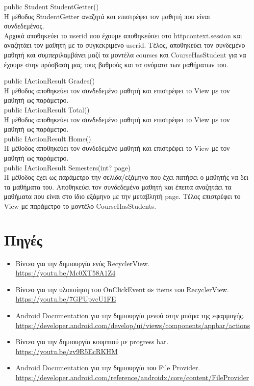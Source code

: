 \documentclass[12pt]{article}
\begin{document}
	public  Student StudentGetter()\\
	
	Η μέθοδος StudentGetter αναζητά και επιστρέφει τον μαθητή που είναι συνδεδεμένος.\\
	Αρχικά αποθηκεύει το userid που έχουμε αποθηκεύσει στο httpcontext.session και αναζητάει τον μαθητή με το συγκεκριμένο userid. Τέλος, αποθηκεύει τον συνδεμένο μαθητή και συμπεριλαμβάνει μαζί τα μοντέλα courses και CourseHasStudent για να έχουμε στην πρόσβαση μας τους βαθμούς και τα ονόματα των μαθήματων του.
	
	public IActionResult Grades()\\
	Η μέθοδος αποθηκεύει τον συνδεδεμένο μαθητή και επιστρέφει το View με τον μαθητή ως παράμετρο. \\
	public IActionResult Total()\\
	Η μέθοδος αποθηκεύει τον συνδεδεμένο μαθητή και επιστρέφει το View με τον μαθητή ως παράμετρο. \\
	
	public IActionResult Home()\\
	Η μέθοδος αποθηκεύει τον συνδεδεμένο μαθητή και επιστρέφει το View με τον μαθητή ως παράμετρο. \\
	
	public IActionResult Semesters(int? page)\\
	Η μέθοδος έχει ως παράμετρο την σελίδα/εξάμηνο που έχει πατήσει ο μαθητής να δει τα μαθήματα του. Αποθηκεύει τον συνδεδεμένο μαθητή και έπειτα αναζητάει τα μαθήματα που είναι στο ίδιο εξάμηνο με την μεταβλητή page. Τέλος επιστρέφει το View με παράμετρο το μοντέλο CourseHasStudents.
	
	

	\section{Πηγές}
	
	\begin{itemize}
		\item Βίντεο για την δημιουργία ενός RecyclerView.\\
		\url{https://youtu.be/Mc0XT58A1Z4}
		
		\item Βίντεο για την υλοποίηση του OnClickEvent σε items του RecyclerView.\\
		\url{https://youtu.be/7GPUpvcU1FE}
		
		\item Android Documentation για την δημιουργία μενού στην μπάρα της εφαρμογής.\\
		\url{https://developer.android.com/develop/ui/views/components/appbar/actions}
		
		\item Βίντεο για την δημιουργία κουμπιού με progress bar.\\
		\url{https://youtu.be/zv9R5EcRKHM}
		
		\item Android Documentation για την δημιουργία του File Provider.\\
		\url{https://developer.android.com/reference/androidx/core/content/FileProvider}
	\end{itemize}
	
	
	
\end{document}
